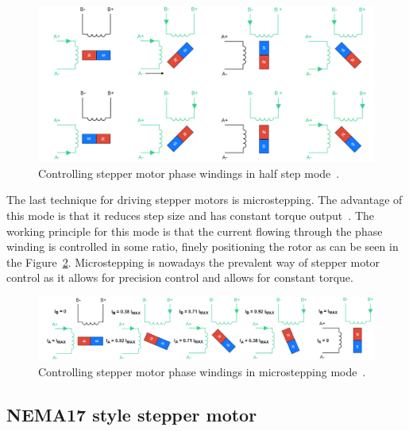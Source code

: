\begin{figure}[H]
    \centering
    \includegraphics[width=\textwidth]{obrazky/half_step_principle}
    \caption{Controlling stepper motor phase windings in half step mode~\cite{carmine_fiore_stepper_2021}.}
    \label{fig:stepper_half_step_mode}
\end{figure}

The last technique for driving stepper motors is microstepping.
The advantage of this mode is that it reduces step size and has constant torque output~\cite{carmine_fiore_stepper_2021}.
The working principle for this mode is that the current flowing through the phase winding is controlled in some ratio, finely positioning the rotor as can be seen in the Figure~\ref{fig:microstepping}.
Microstepping is nowadays the prevalent way of stepper motor control as it allows for precision control and allows for constant torque.

\begin{figure}[H]
    \centering
    \includegraphics[width=\textwidth]{obrazky/microstepping}
    \caption{Controlling stepper motor phase windings in microstepping mode~\cite{carmine_fiore_stepper_2021}.}
    \label{fig:microstepping}
\end{figure}

\subsection{NEMA17 style stepper motor}
\label{subsec:nema}

